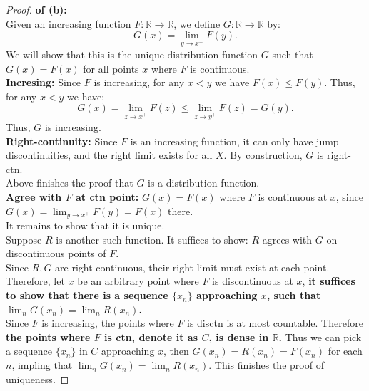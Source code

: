 \documentclass[lang=cn,11pt]{elegantbook}
\begin{document}
\begin{proof} \textbf{of (b):}\\
Given an increasing function \( F: \mathbb{R} \to \mathbb{R} \), we define $G:\mathbb{R} \to \mathbb{R}$ by:
\[
G(x) = \lim_{y \to x^+} F(y).
\]
We will show that this is the unique distribution function $G$ such that $G(x)=F(x)$ for all points $x$ where $F$ is continuous.\\
\textbf{Incresing:} Since \( F \) is increasing, for any \( x < y \) we have \( F(x) \le F(y) \). Thus, for any \( x < y \) we have:
\[
G(x) = \lim_{z \to x^+} F(z) \le \lim_{z \to y^+} F(z) = G(y).
\]
Thus, \( G \) is increasing.\\
\textbf{Right-continuity:} Since $F$ is an increasing function, it can only have jump discontinuities, and the right limit exists for all $X$. By construction, $G$ is right-ctn.\\
Above finishes the proof that $G$ is a distribution function.\\
\textbf{Agree with $F$ at ctn point:} $G(x) = F(x)$ where $F$ is continuous at $x$, since $G(x) = \lim_{y\to x^+} F(y) = F(x) $ there.\\

It remains to show that it is unique.\\
Suppose $R$ is another such function. It suffices to show: $R $ agrees with $G$ on discontinuous points of $F$.\\
Since $R,G$ are right continuous, their right limit must exist at each point. Therefore, let $x$ be an arbitrary point where $F$ is discontinuous at $x$, \textbf{it suffices to show that there is a sequence $\{x_n\}$ approaching $x$, such that $\lim_n G(x_n)  = \lim_n R(x_n)$.}\\
Since $F$ is increasing, the points where $F$ is disctn is at most countable. Therefore\textbf{ the points where $F$ is ctn, denote it as $C$, is dense in $\mathbb{R}$.} Thus we can pick a sequence $\{x_n\}$ in $C$ approaching $x$, then $G(x_n) = R(x_n) = F(x_n)$ for each $n$, impling that $\lim_n G(x_n)  = \lim_n R(x_n)$. This finishes the proof of uniqueness.

\end{proof}

\end{document}
